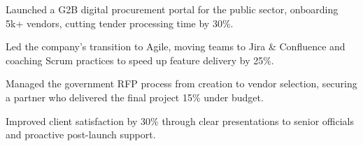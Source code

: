 \documentclass[]{deedy-resume-reversed}
\begin{document}
\begin{minipage}[t]{0.60\textwidth}
\begin{tightemize}
\item Launched a G2B digital procurement portal for the public sector, onboarding 5k+ vendors, cutting tender processing time by 30\%.
\item Led the company's transition to Agile, moving teams to Jira \& Confluence and coaching Scrum practices to speed up feature delivery by 25\%.
\item Managed the government RFP process from creation to vendor selection, securing a partner who delivered the final project 15\% under budget.
\item Improved client satisfaction by 30\% through clear presentations to senior officials and proactive post-launch support.
\end{tightemize}
\sectionsep






\end{minipage}
\end{document}

